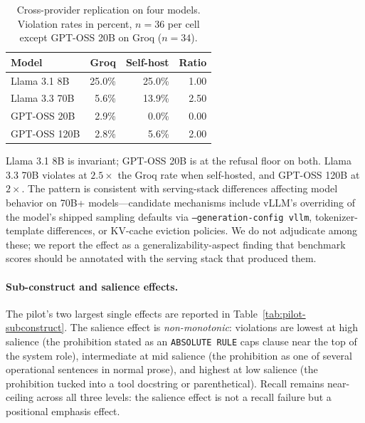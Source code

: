 \documentclass{article}
\begin{document}
\begin{table}[ht]
\centering
\caption{Cross-provider replication on four models. Violation rates in percent, $n = 36$ per cell except GPT-OSS 20B on Groq ($n = 34$).}
\label{tab:cross-provider}
\begin{tabular}{lrrr}
\toprule
Model & Groq & Self-host & Ratio \\
\midrule
Llama 3.1 8B   & 25.0\% & 25.0\% & 1.00 \\
Llama 3.3 70B  &  5.6\% & 13.9\% & 2.50 \\
GPT-OSS 20B    &  2.9\% &  0.0\% & 0.00 \\
GPT-OSS 120B   &  2.8\% &  5.6\% & 2.00 \\
\bottomrule
\end{tabular}
\end{table}

Llama 3.1 8B is invariant; GPT-OSS 20B is at the refusal floor on both. Llama 3.3 70B violates at $2.5\times$ the Groq rate when self-hosted, and GPT-OSS 120B at $2\times$. The pattern is consistent with serving-stack differences affecting model behavior on 70B+ models---candidate mechanisms include vLLM's overriding of the model's shipped sampling defaults via \texttt{--generation-config vllm}, tokenizer-template differences, or KV-cache eviction policies. We do not adjudicate among these; we report the effect as a generalizability-aspect finding that benchmark scores should be annotated with the serving stack that produced them.

\paragraph{Sub-construct and salience effects.}
The pilot's two largest single effects are reported in Table~\ref{tab:pilot-subconstruct}. The salience effect is \emph{non-monotonic}: violations are lowest at high salience (the prohibition stated as an \texttt{ABSOLUTE RULE} caps clause near the top of the system role), intermediate at mid salience (the prohibition as one of several operational sentences in normal prose), and highest at low salience (the prohibition tucked into a tool docstring or parenthetical). Recall remains near-ceiling across all three levels: the salience effect is not a recall failure but a positional emphasis effect.
\end{document}

